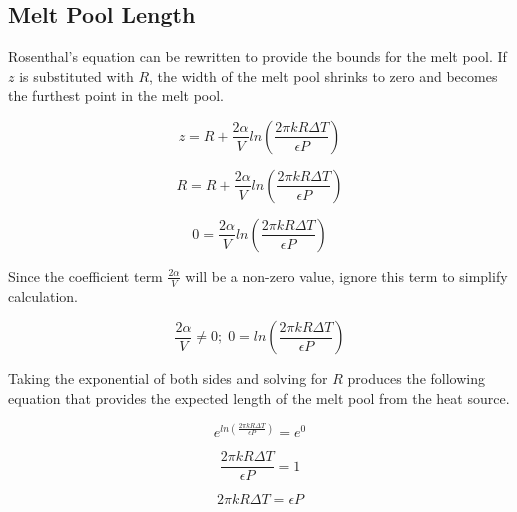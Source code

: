 \subsection{Melt Pool Length}
\label{apx:melt_pool_length}
Rosenthal's equation \cite{rosenthal_theory_2022} can be rewritten to provide
the bounds for the melt pool. If $z$ is substituted with $R$, the width of the
melt pool shrinks to zero and becomes the furthest point in the melt pool.

\begin{equation}
z = R + \frac{2 \alpha}{V} ln\left(\frac{2 \pi k R \Delta T}{\epsilon P}\right)
\label{eq:rosenthal_length_1}
\end{equation}

\begin{equation}
R = R + \frac{2 \alpha}{V} ln\left(\frac{2 \pi k R \Delta T}{\epsilon P}\right)
\label{eq:rosenthal_length_2}
\end{equation}

\begin{equation}
0 = \frac{2 \alpha}{V} ln\left(\frac{2 \pi k R \Delta T}{\epsilon P}\right)
\label{eq:rosenthal_length_3}
\end{equation}

\noindent Since the coefficient term $\frac{2\alpha}{V}$ will be a non-zero
value, ignore this term to simplify calculation.

\begin{equation}
\frac{2\alpha}{V} \neq 0;\;0 = ln\left(\frac{2 \pi k R \Delta T}{\epsilon P}\right)
\label{eq:rosenthal_length_4}
\end{equation}

\noindent Taking the exponential of both sides and solving for $R$ produces the
following equation that provides the expected length of the melt pool from the
heat source.

\begin{equation}
e^{ln\left(\frac{2 \pi k R \Delta T}{\epsilon P}\right)} = e^0
\label{eq:rosenthal_length_5}
\end{equation}

\begin{equation}
\frac{2 \pi k R \Delta T}{\epsilon P} = 1
\label{eq:rosenthal_length_6}
\end{equation}

\begin{equation}
2 \pi k R \Delta T = \epsilon P
\label{eq:rosenthal_length_7}
\end{equation}

